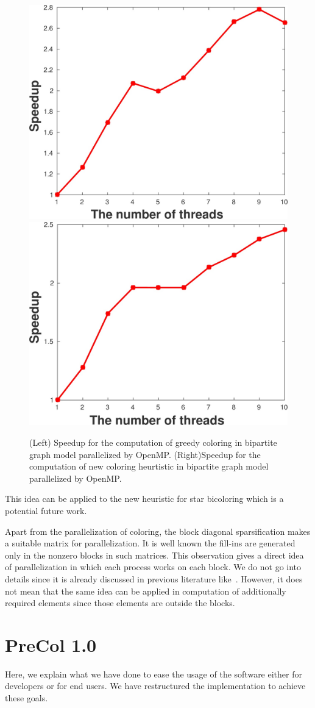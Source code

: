 \documentclass[12pt, twoside]{book}
\begin{document}
\begin{figure}
\includegraphics[width=0.44\linewidth]{ths_spd.jpg}\hfill
\includegraphics[width=0.47\linewidth]{ths_spd2.jpg}
\caption{
(Left) Speedup for the computation of greedy coloring in bipartite graph model parallelized by OpenMP.
(Right)Speedup for the computation of new coloring heurtistic in bipartite graph model parallelized by OpenMP.
}
\label{speedups}
\end{figure}
This idea can be applied to the new heuristic for star bicoloring which is a potential future work.

Apart from the parallelization of coloring, the block diagonal sparsification makes a suitable
matrix for parallelization. It is well known the fill-ins are generated only in the nonzero blocks in such matrices. This observation gives a direct idea of parallelization in which each process
works on each block. We do not go into details since it is already discussed in previous literature like~\cite{parblockilu}. However, it does not mean that the same idea can be applied in computation of
additionally required elements since those elements are outside the blocks.


\section{PreCol 1.0}%
\label{s.extend}
Here, we explain what we have done to ease the usage of the software
either for developers or for end users. We have restructured the implementation
to achieve these goals.
\end{document}
